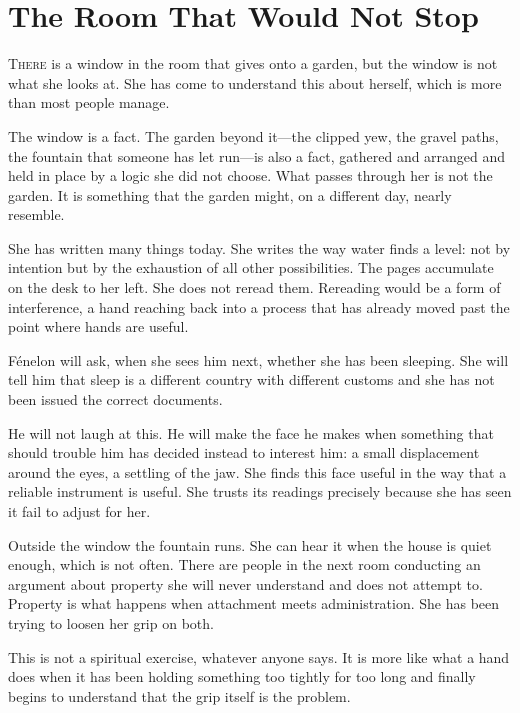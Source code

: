 
\chapter{The Room That Would Not Stop}


\lettrine{T}{here} is a window in the room that gives onto a garden, but the window
is not what she looks at. She has come to understand this about
herself, which is more than most people manage.

The window is a fact. The garden beyond it---the clipped yew, the
gravel paths, the fountain that someone has let run---is also a
fact, gathered and arranged and held in place by a logic she did not
choose. What passes through her is not the garden. It is something
that the garden might, on a different day, nearly resemble.

She has written many things today. She writes the way water finds a
level: not by intention but by the exhaustion of all other
possibilities. The pages accumulate on the desk to her left. She
does not reread them. Rereading would be a form of interference, a
hand reaching back into a process that has already moved past the
point where hands are useful.

Fénelon will ask, when she sees him next, whether she has been
sleeping. She will tell him that sleep is a different country with
different customs and she has not been issued the correct
documents.

He will not laugh at this. He will make the face he makes when
something that should trouble him has decided instead to interest
him: a small displacement around the eyes, a settling of the jaw.
She finds this face useful in the way that a reliable instrument
is useful. She trusts its readings precisely because she has seen
it fail to adjust for her.

\scenebreak

Outside the window the fountain runs. She can hear it when the house
is quiet enough, which is not often. There are people in the next
room conducting an argument about property she will never understand
and does not attempt to. Property is what happens when attachment
meets administration. She has been trying to loosen her grip on
both.

This is not a spiritual exercise, whatever anyone says. It is more
like what a hand does when it has been holding something too tightly
for too long and finally begins to understand that the grip itself
is the problem.


